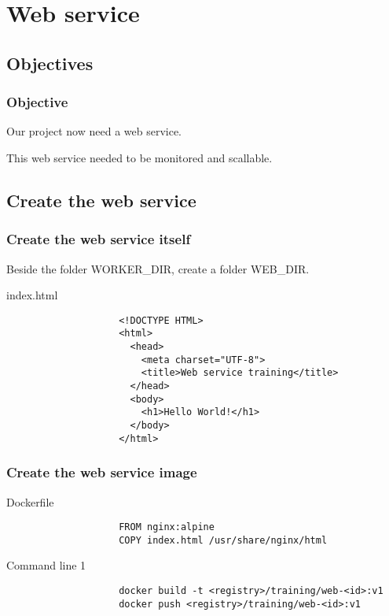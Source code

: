 \section{Web service}

\subsection{Objectives}

	\begin{frame}
		\frametitle{Objective}
		
		Our project now need a web service.

		\bigskip
		This web service needed to be monitored and scallable.		
		
	\end{frame}
	
\subsection{Create the web service}
	\begin{frame}[fragile]
		\frametitle{Create the web service itself}
		
		Beside the folder WORKER\_DIR, create a folder WEB\_DIR.

		\begin{block}{index.html}
			\begin{small}
				\begin{verbatim}
					<!DOCTYPE HTML>
					<html>
					  <head>
					    <meta charset="UTF-8">
					    <title>Web service training</title>
					  </head>
					  <body>
					    <h1>Hello World!</h1>
					  </body>
					</html>
				\end{verbatim}
			\end{small}
		\end{block}			
	\end{frame}
	
	\begin{frame}[fragile]
		\frametitle{Create the web service image}
		
		\begin{block}{Dockerfile}
			\begin{small}
				\begin{verbatim}
					FROM nginx:alpine
					COPY index.html /usr/share/nginx/html
				\end{verbatim}
			\end{small}
		\end{block}
		
		\begin{block}{Command line 1}
			\begin{small}
				\begin{verbatim}
					docker build -t <registry>/training/web-<id>:v1
					docker push <registry>/training/web-<id>:v1
				\end{verbatim}
			\end{small}
		\end{block}
		
	\end{frame}
	
